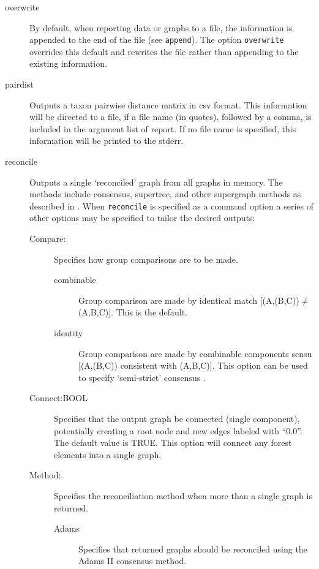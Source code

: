 \begin{description}
		\item[overwrite] By default, when reporting data or graphs to a file, the 
		information is appended to the end of the file (see \texttt{append}). The 
		option \texttt{overwrite} overrides this default and rewrites the file rather 
		than appending to the existing information.

		\item[pairdist] Outputs a taxon pairwise distance matrix in csv format. 
		This information will be directed to a file, if a file name (in quotes), followed 
		by a comma, is included in the argument list of report. If no file name is 
		specified, this information will be printed to the stderr.
		
		\item[reconcile] Outputs a single `reconciled' graph from all graphs in 
		memory. The methods include consensus, supertree, and other supergraph 
		methods as described in \cite{Wheeler2012, Wheeler2022}. When \texttt{reconcile} 
		is specified as a command option a series of other options may be specified 
		to tailor the desired outputs:
		
		\begin{description}
			\item [Compare:] Specifies how group comparisons are to be made.
						
			\begin{description}
				\item[combinable] Group comparison are made by identical match 
				[(A,(B,C))$\neq$(A,B,C)]. This is the default.	
								
				\item[identity] Group comparison are made by combinable components sensu 
				     \cite{Nelson1979} [(A,(B,C)) consistent with (A,B,C)]. This option can be used 
				     to specify `semi-strict' consensus \citep{Bremer1990}.
			\end{description}
			
			\item [Connect:BOOL] Specifies that the output graph be connected 
			(single component), potentially creating a root node and new edges labeled 
			with ``0.0''. The default value is TRUE. This option will connect any forest elements
			into a single graph. 
			
			\item [Method:] Specifies the reconciliation method when more than a single
			   graph is returned.
			
			\begin{description}
				\item[Adams] Specifies that returned graphs should be reconciled using the Adams II 
				consensus \citep{Adams1972} method.
				

\end{description}
\end{description}
\end{description}

